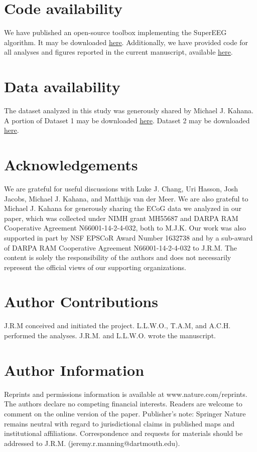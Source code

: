 \documentclass[11pt]{article}
\begin{document}
\section*{Code availability}
We have published an open-source toolbox
implementing the SuperEEG algorithm.  It may be downloaded
\href{https://supereeg.readthedocs.io/en/latest/}{\underline{here}}.
Additionally, we have provided code for all analyses and figures reported in the
current manuscript, available
\href{https://github.com/ContextLab/supereeg_paper}{\underline{here}}.

\section*{Data availability}
The dataset analyzed in this study was generously shared by Michael
J. Kahana.  A portion of Dataset 1 may be downloaded
\href{http://memory.psych.upenn.edu/Request_EEG_access?paper=SedeEtal03}{\underline{here}}.
Dataset 2 may be downloaded
\href{http://memory.psych.upenn.edu/Request_EEG_access?paper=EzzyEtal17}{\underline{here}}.

\section*{Acknowledgements}
We are grateful for useful discussions with Luke J.
Chang, Uri Hasson, Josh Jacobs, Michael J. Kahana, and Matthijs van der Meer.
We are also grateful to Michael J. Kahana for generously sharing the ECoG data
we analyzed in our paper, which was collected under NIMH grant MH55687 and DARPA
RAM Cooperative Agreement N66001-14-2-4-032, both to M.J.K.  Our work was also
supported in part by NSF EPSCoR Award Number 1632738 and by a sub-award of DARPA
RAM Cooperative Agreement N66001-14-2-4-032 to J.R.M.  The content is solely the
responsibility of the authors and does not necessarily represent the official
views of our supporting organizations.

\section*{Author Contributions}
J.R.M conceived and initiated the project.
L.L.W.O., T.A.M, and A.C.H. performed the analyses. J.R.M. and L.L.W.O. wrote
the manuscript.

\section*{Author Information}
Reprints and permissions information is available
at www.nature.com/reprints.  The authors declare no competing financial
interests.  Readers are welcome to comment on the online version of the paper.
Publisher's note: Springer Nature remains neutral with regard to jurisdictional
claims in published maps and institutional affiliations.  Correspondence and
requests for materials should be addressed to J.R.M.
(jeremy.r.manning@dartmouth.edu).




\clearpage
\end{document}
